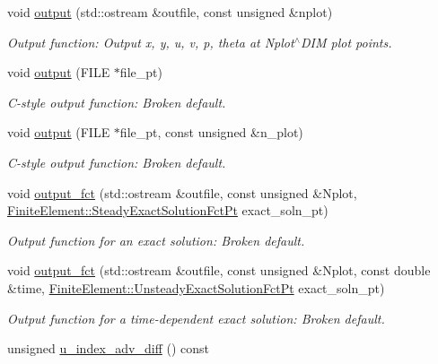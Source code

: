 \begin{DoxyCompactItemize}
void \hyperlink{classoomph_1_1BuoyantQCrouzeixRaviartElement_a855783400ac22a61e151d1611ad8e47e}{output} (std\+::ostream \&outfile, const unsigned \&nplot)
\begin{DoxyCompactList}\small\item\em Output function\+: Output x, y, u, v, p, theta at Nplot$^\wedge$\+D\+IM plot points. \end{DoxyCompactList}\item 
void \hyperlink{classoomph_1_1BuoyantQCrouzeixRaviartElement_a9ba77409f12b80862262f6695829055b}{output} (F\+I\+LE $\ast$file\+\_\+pt)
\begin{DoxyCompactList}\small\item\em C-\/style output function\+: Broken default. \end{DoxyCompactList}\item 
void \hyperlink{classoomph_1_1BuoyantQCrouzeixRaviartElement_a48039bbb2f32897b70fb0858ff739516}{output} (F\+I\+LE $\ast$file\+\_\+pt, const unsigned \&n\+\_\+plot)
\begin{DoxyCompactList}\small\item\em C-\/style output function\+: Broken default. \end{DoxyCompactList}\item 
void \hyperlink{classoomph_1_1BuoyantQCrouzeixRaviartElement_ad36c2a18f2de8b00f76baccc15b768c2}{output\+\_\+fct} (std\+::ostream \&outfile, const unsigned \&Nplot, \hyperlink{classoomph_1_1FiniteElement_a690fd33af26cc3e84f39bba6d5a85202}{Finite\+Element\+::\+Steady\+Exact\+Solution\+Fct\+Pt} exact\+\_\+soln\+\_\+pt)
\begin{DoxyCompactList}\small\item\em Output function for an exact solution\+: Broken default. \end{DoxyCompactList}\item 
void \hyperlink{classoomph_1_1BuoyantQCrouzeixRaviartElement_ae1c6dc6850532af9ec618415ba31e053}{output\+\_\+fct} (std\+::ostream \&outfile, const unsigned \&Nplot, const double \&time, \hyperlink{classoomph_1_1FiniteElement_ad4ecf2b61b158a4b4d351a60d23c633e}{Finite\+Element\+::\+Unsteady\+Exact\+Solution\+Fct\+Pt} exact\+\_\+soln\+\_\+pt)
\begin{DoxyCompactList}\small\item\em Output function for a time-\/dependent exact solution\+: Broken default. \end{DoxyCompactList}\item 
unsigned \hyperlink{classoomph_1_1BuoyantQCrouzeixRaviartElement_acf5fa44f694c5374c61a964020437bf4}{u\+\_\+index\+\_\+adv\+\_\+diff} () const

\end{DoxyCompactItemize}
